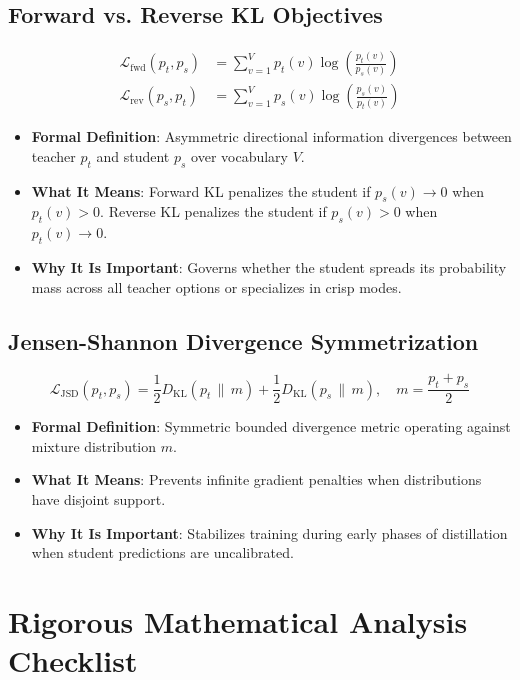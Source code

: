 \documentclass[11pt,a4paper]{article}
\theoremstyle{definition}
\begin{document}
\subsection{Forward vs. Reverse KL Objectives}
{\boldmath
\begin{align}
\mathcal{L}_{\text{fwd}}(p_t, p_s) &= \sum_{v=1}^V p_t(v) \log \left(\frac{p_t(v)}{p_s(v)}\right) \\
\mathcal{L}_{\text{rev}}(p_s, p_t) &= \sum_{v=1}^V p_s(v) \log \left(\frac{p_s(v)}{p_t(v)}\right)
\end{align}
}
\begin{itemize}
    \item \textbf{Formal Definition}: Asymmetric directional information divergences between teacher $p_t$ and student $p_s$ over vocabulary $V$.
    \item \textbf{What It Means}: Forward KL penalizes the student if $p_s(v) \to 0$ when $p_t(v) > 0$. Reverse KL penalizes the student if $p_s(v) > 0$ when $p_t(v) \to 0$.
    \item \textbf{Why It Is Important}: Governs whether the student spreads its probability mass across all teacher options or specializes in crisp modes.
\end{itemize}

\subsection{Jensen-Shannon Divergence Symmetrization}
{\boldmath
\begin{equation}
\mathcal{L}_{\text{JSD}}(p_t, p_s) = \frac{1}{2} D_{\text{KL}}(p_t \,\|\, m) + \frac{1}{2} D_{\text{KL}}(p_s \,\|\, m), \quad m = \frac{p_t + p_s}{2}
\end{equation}
}
\begin{itemize}
    \item \textbf{Formal Definition}: Symmetric bounded divergence metric operating against mixture distribution $m$.
    \item \textbf{What It Means}: Prevents infinite gradient penalties when distributions have disjoint support.
    \item \textbf{Why It Is Important}: Stabilizes training during early phases of distillation when student predictions are uncalibrated.
\end{itemize}

\section{Rigorous Mathematical Analysis Checklist}
\end{document}
